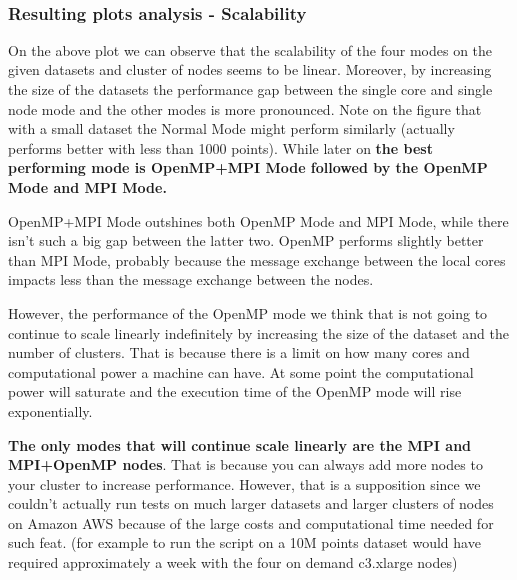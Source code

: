 \documentclass[11pt]{article}
\begin{document}
    \begin{center}
    \end{center}
    { \hspace*{\fill} \\}
    
    \hypertarget{resulting-plots-analysis---scalability}{%
\subsubsection{Resulting plots analysis -
Scalability}\label{resulting-plots-analysis---scalability}}

On the above plot we can observe that the scalability of the four modes
on the given datasets and cluster of nodes seems to be linear. Moreover,
by increasing the size of the datasets the performance gap between the
single core and single node mode and the other modes is more pronounced.
Note on the figure that with a small dataset the Normal Mode might
perform similarly (actually performs better with less than 1000 points).
While later on \textbf{the best performing mode is OpenMP+MPI Mode
followed by the OpenMP Mode and MPI Mode.}

OpenMP+MPI Mode outshines both OpenMP Mode and MPI Mode, while there
isn't such a big gap between the latter two. OpenMP performs slightly
better than MPI Mode, probably because the message exchange between the
local cores impacts less than the message exchange between the nodes.

However, the performance of the OpenMP mode we think that is not going
to continue to scale linearly indefinitely by increasing the size of the
dataset and the number of clusters. That is because there is a limit on
how many cores and computational power a machine can have. At some point
the computational power will saturate and the execution time of the
OpenMP mode will rise exponentially.

\textbf{The only modes that will continue scale linearly are the MPI and
MPI+OpenMP nodes}. That is because you can always add more nodes to your
cluster to increase performance. However, that is a supposition since we
couldn't actually run tests on much larger datasets and larger clusters
of nodes on Amazon AWS because of the large costs and computational time
needed for such feat. (for example to run the script on a 10M points
dataset would have required approximately a week with the four on demand
c3.xlarge nodes)
\end{document}
